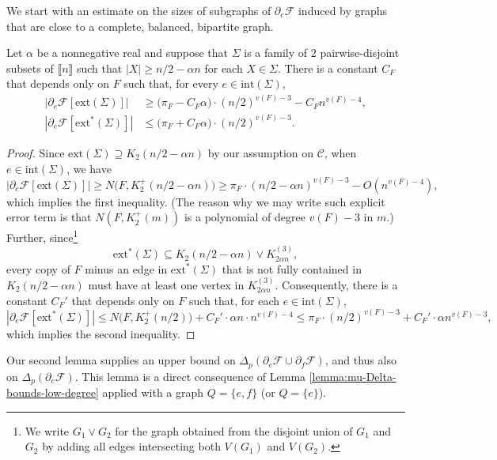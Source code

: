 \documentclass[11pt,a4paper,oneside,reqno]{amsart}
\newcommand{\cC}{\mathcal{C}}
\newcommand{\cF}{\mathcal{F}}
\newcommand{\1}{\mathbbm{1}} %
\newcommand{\br}[1]{\llbracket{#1}\rrbracket}
\renewcommand{\le}{\leqslant}
\renewcommand{\ge}{\geqslant}
\newcommand{\ext}{\mathrm{ext}}
\renewcommand{\int}{\mathrm{int}}
\begin{document}
We start with an estimate on the sizes of subgraphs of $\partial_e \cF$ induced by graphs that are close to a complete, balanced, bipartite graph.
\begin{lemma}
  \label{lemma:copies-of-H-ext}
  Let $\alpha$ be a nonnegative real and suppose that $\Sigma$ is a family of $2$ pairwise-disjoint subsets of $\br{n}$ such that $|X| \ge n/2 - \alpha n$ for each $X \in \Sigma$.
  There is a constant $C_F$ that depends only on $F$ such that, for every $e \in \int(\Sigma)$,
  \begin{align*}
    |\partial_e \cF [\ext(\Sigma)]| & \ge \big(\pi_F - C_F\alpha \big) \cdot (n/2)^{v(F)-3} - C_F n^{v(F)-4}, \\
    |\partial_e \cF [\ext^*(\Sigma)]| & \le \big(\pi_F + C_F\alpha\big) \cdot (n/2)^{v(F)-3}.
  \end{align*}
\end{lemma}
\begin{proof}
  Since $\ext(\Sigma) \supseteq K_2(n/2-\alpha n)$ by our assumption on $\cC$, when $e \in \int(\Sigma)$, we have
  \[
    |\partial_e \cF [\ext(\Sigma)]| \ge N\big(F, K_2^+(n/2-\alpha n)\big) \ge \pi_F \cdot (n/2-\alpha n)^{v(F)-3} - O(n^{v(F)-4}),
  \]
  which implies the first inequality.  (The reason why we may write such explicit error term is that $N(F, K_2^+(m))$ is a polynomial of degree $v(F)-3$ in $m$.)
  Further, since\footnote{We write $G_1 \vee G_2$ for the graph obtained from the disjoint union of $G_1$ and $G_2$ by adding all edges intersecting both $V(G_1)$ and $V(G_2)$.}
  \[
    \ext^*(\Sigma) \subseteq K_2(n/2-\alpha n) \vee K_{2\alpha n}^{(3)},
  \]
  every copy of $F$ minus an edge in $\ext^*(\Sigma)$ that is not fully contained in $K_2(n/2-\alpha n)$ must have at least one vertex in $K_{2\alpha n}^{(3)}$.  Consequently, there is a constant $C_F'$ that depends only on $F$ such that, for each $e \in \int(\Sigma)$, 
  \[
    |\partial_e\cF[\ext^*(\Sigma)]| \le N\big(F, K_2^+(n/2)\big) + C_F' \cdot \alpha n \cdot n^{v(F)-4} \le \pi_F \cdot (n/2)^{v(F)-3} + C_F' \cdot \alpha n^{v(F)-3},
  \]
  which implies the second inequality.
\end{proof}

Our second lemma supplies an upper bound on $\Delta_p(\partial_e \cF \cup \partial_f \cF)$, and thus also on $\Delta_p(\partial_e \cF)$. This lemma is a direct consequence of Lemma \ref{lemma:mu-Delta-bounds-low-degree} applied with a graph $Q = \{e, f\}$ (or $Q = \{e\}$).
\end{document}
